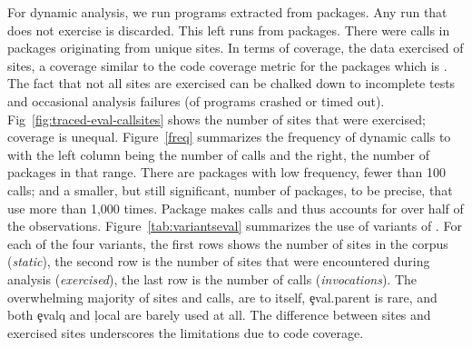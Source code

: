 \documentclass[review,nonacm,screen,acmsmall,anonymous=true]{acmart}
\begin{document}
For dynamic analysis, we run \CranRunnableScripts programs extracted from
\CranPackages packages. Any run that does not exercise \eval is discarded. This
left \packageNbruns runs from \packageCorpus packages. There were
\packageAllcalls calls in \packageTriggeredpkgs packages originating from
\PkgHitEvalCallSites unique sites. In terms of coverage, the data exercised
\PkgHitEvalCallSitesAvgRatio of sites, a coverage similar to the code coverage
metric for the packages which is \PkgCodeCoverage. The fact that not all sites
are exercised can be chalked down to incomplete tests and occasional analysis
failures (\PkgFailedProgramsRatio of programs crashed or timed out).
Fig~\ref{fig:traced-eval-callsites} shows the number of sites that were
exercised; coverage is unequal. Figure~\ref{freq} summarizes the frequency of
dynamic calls to \eval with the left column being the number of calls and the
right, the number of packages in that range. There are \packageFewcalls packages
with low \eval frequency, fewer than 100 calls; and a smaller, but still
significant, number of packages, \packageManycalls to be precise, that use \eval
more than 1,000 times. Package \packageMaxcallspack makes \packageMaxcalls calls
and thus accounts for over half of the observations.
Figure~\ref{tab:variantseval} summarizes the use of variants of \eval. For each
of the four variants, the first rows shows the number of sites in the corpus
(\emph{static}), the second row is the number of sites that were encountered
during analysis (\emph{exercised}), the last row is the number of calls
(\emph{invocations}). The overwhelming majority of sites and calls, are to \eval
itself, \c{eval.parent} is rare, and both \c{evalq} and \c{local} are barely
used at all. The difference between sites and exercised sites underscores the
limitations due to code coverage.
\end{document}
